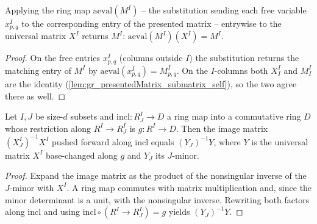 \begin{lemma}
  \label{lem:gr_universalMatrix_map_presentedMatrix}
  Applying the ring map \(\mathrm{aeval}(M^I)\) -- the substitution sending each free variable
  \(x^I_{p,q}\) to the corresponding entry of the presented matrix -- entrywise to the
  universal matrix \(X^I\) returns \(M^I\): \(\mathrm{aeval}(M^I)(X^I) = M^I\).
\end{lemma}
\begin{proof}
  \leanok
  On the free entries \(x^I_{p,q}\) (columns outside \(I\)) the substitution returns the
  matching entry of \(M^I\) by \(\mathrm{aeval}(x^I_{p,q}) = M^I_{p,q}\). On the \(I\)-columns
  both \(X^I_I\) and \(M^I_I\) are the identity (\cref{lem:gr_presentedMatrix_submatrix_self}),
  so the two agree there as well.
\end{proof}

\begin{lemma}
  \label{lem:gr_imageMatrix_map_ringHom}
  Let \(I, J\) be size-\(d\) subsets and \(\mathrm{incl} : R^I_J \to D\) a ring map into a
  commutative ring \(D\) whose restriction along \(R^I \to R^I_J\) is \(g : R^I \to D\). Then
  the image matrix \((X^I_J)^{-1}X^I\) pushed forward along \(\mathrm{incl}\) equals
  \((Y_J)^{-1}Y\), where \(Y\) is the universal matrix \(X^I\) base-changed along \(g\) and
  \(Y_J\) its \(J\)-minor.
\end{lemma}
\begin{proof}

\leanok
  Expand the image matrix as the product of the nonsingular inverse of the \(J\)-minor with
  \(X^I\). A ring map commutes with matrix multiplication and, since the minor determinant is
  a unit, with the nonsingular inverse. Rewriting both factors along \(\mathrm{incl}\) and
  using \(\mathrm{incl}\circ(R^I\to R^I_J) = g\) yields \((Y_J)^{-1}Y\).
\end{proof}

